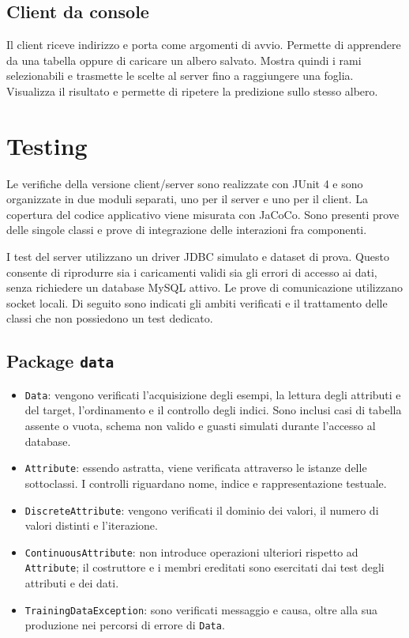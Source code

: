 \documentclass[11pt,a4paper]{article}
\begin{document}
\subsection*{Client da console}

Il client riceve indirizzo e porta come argomenti di avvio. Permette di apprendere
da una tabella oppure di caricare un albero salvato. Mostra quindi i rami
selezionabili e trasmette le scelte al server fino a raggiungere una foglia.
Visualizza il risultato e permette di ripetere la predizione sullo stesso albero.



\clearpage
\section*{Testing}

Le verifiche della versione client/server sono realizzate con JUnit 4 e sono
organizzate in due moduli separati, uno per il server e uno per il client.
La copertura del codice applicativo viene misurata con JaCoCo. Sono presenti
prove delle singole classi e prove di integrazione delle interazioni fra
componenti.

I test del server utilizzano un driver JDBC simulato e dataset di prova. Questo
consente di riprodurre sia i caricamenti validi sia gli errori di accesso ai dati,
senza richiedere un database MySQL attivo. Le prove di comunicazione utilizzano
socket locali. Di seguito sono indicati gli ambiti verificati e il trattamento
delle classi che non possiedono un test dedicato.

\subsection*{Package \texttt{data}}

\begin{itemize}
  \item \texttt{Data}: vengono verificati l'acquisizione degli esempi, la lettura
        degli attributi e del target, l'ordinamento e il controllo degli indici.
        Sono inclusi casi di tabella assente o vuota, schema non valido e guasti
        simulati durante l'accesso al database.
  \item \texttt{Attribute}: essendo astratta, viene verificata attraverso le
        istanze delle sottoclassi. I controlli riguardano nome, indice e
        rappresentazione testuale.
  \item \texttt{DiscreteAttribute}: vengono verificati il dominio dei valori,
        il numero di valori distinti e l'iterazione.
  \item \texttt{ContinuousAttribute}: non introduce operazioni ulteriori rispetto
        ad \texttt{Attribute}; il costruttore e i membri ereditati sono esercitati
        dai test degli attributi e dei dati.
  \item \texttt{TrainingDataException}: sono verificati messaggio e causa,
        oltre alla sua produzione nei percorsi di errore di \texttt{Data}.
\end{itemize}
\end{document}
